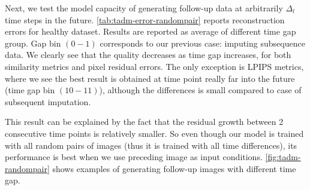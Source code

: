 Next, we test the model capacity of generating follow-up data at arbitrarily $\Delta_l$ time steps in the future. \cref{tab:tadm-error-randompair} reports reconstruction errors for healthy dataset. Results are reported as average of different time gap group. Gap bin $(0-1)$ corresponds to our previous case: imputing subsequence data. We clearly see that the quality decreases as time gap increases, for both similarity metrics and pixel residual errors. The only exception is LPIPS metrics, where we see the best result is obtained at time point really far into the future (time gap bin $(10-11)$), although the differences is small compared to case of subsequent imputation. 

This result can be explained by the fact that the residual growth between 2 consecutive time points is relatively smaller. So even though our model is trained with all random pairs of images (thus it is trained with all time differences), its performance is best when we use preceding image as input conditions. \cref{fig:tadm-randompair} shows examples of generating follow-up images with different time gap. 

